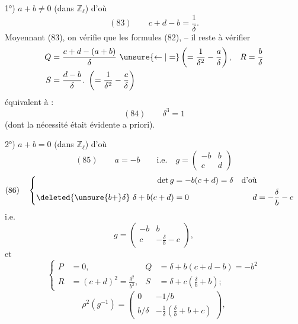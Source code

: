 


1°) $a+b\ne0$ (dans $\mathbb Z_\ell$) d'où
\[
(83)\qquad\boxed{c+d-b=\frac1\delta}.
\]
Moyennant (83), on vérifie que les formules (82), --  il reste à vérifier
\[
\begin{aligned}
Q&=\frac{c+d-(a+b)}\delta\ \unsure{\leftarrow|=}\left(=\frac1{\delta^2}-\frac a\delta\right),&R&=\frac b\delta\\
S&=\frac{d-b}\delta.\ \left(=\frac1{\delta^2}-\frac c\delta\right)
\end{aligned}
\]
équivalent à :
\[
(84)\qquad\boxed{\delta^3=1}
\]
(dont la nécessité était évidente a priori).


2°) $a+b=0$ (dans $\mathbb Z_\ell$) d'où
\[
(85)\qquad a=-b\qquad\text{i.e.}\quad g=\begin{pmatrix}-b&b\\c&d\end{pmatrix}
\]
\[
(86)\quad\left\{\begin{aligned}
\det g&=-b(c+d)=\delta&\text{d'où}\\
\deleted{\unsure{b+}\delta}\ \delta+b(c+d)&=0&d&=-\frac\delta b-c
\end{aligned}\right.
\]
i.e.
\[
g=\begin{pmatrix}-b&b\\c&-\frac\delta b-c\end{pmatrix},
\]
et
\[
\left\{\begin{aligned}
P&=0,&Q&=\delta+b(c+d-b)=-b^2\\
R&=(c+d)^2=\frac{\delta^2}{b^2},&S&=\delta+c\left(\frac\delta b+b\right);
\end{aligned}\right.
\]
\[
\rho^2(g^{-1})=\begin{pmatrix}0&-1/b\\b/\delta&-\frac1\delta\left(\frac\delta b+b+c\right)\end{pmatrix},
\]

